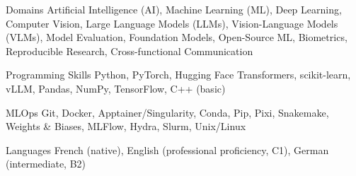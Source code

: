 

\begin{cvskills}

  \cvskill
    {Domains} %
    {Artificial Intelligence (AI), Machine Learning (ML), Deep Learning, Computer Vision, Large Language Models (LLMs), Vision-Language Models (VLMs), Model Evaluation, Foundation Models, Open-Source ML, Biometrics, Reproducible Research, Cross-functional Communication} %

  \cvskill
    {Programming Skills} %
    {Python, PyTorch, Hugging Face Transformers, scikit-learn, vLLM, Pandas, NumPy, TensorFlow, C++ (basic)} %

  \cvskill
    {MLOps} %
    {Git, Docker, Apptainer/Singularity, Conda, Pip, Pixi, Snakemake, Weights \& Biases, MLFlow, Hydra, Slurm, Unix/Linux} %

  \cvskill
    {Languages} %
    {French (native), English (professional proficiency, C1), German (intermediate, B2)} %

\end{cvskills}
